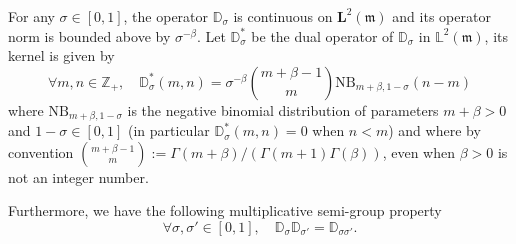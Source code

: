 \documentclass[AHL,Unicode,longabstracts]{cedram}
\newcommand{\df}{\mathrel{:=}}
\newcommand{\LL}{\mathbb{L}}
\newcommand{\ZZ}{\mathbb{Z}}
\newcommand{\fm}{\mathfrak{m}}
\newcommand{\esL}{\mathbf{L}}
\newcommand{\discret}[1]{\mathds{#1}}
\let\oldforall\forall
\renewcommand*{\forall}{\mathrel{\oldforall}}
\begin{document}
\begin{lemm}\label{dualdD}
For any $\sigma\in [0,1]$, the operator $\discret{D}_{\sigma}$ is continuous on $\esL^2(\fm)$ and its operator norm is bounded above by ${\sigma}^{-\beta}$. Let $\discret{D}_{\sigma}^*$ be the dual operator of $\discret{D}_{\sigma}$ in $\LL^2(\fm)$, its kernel is given by
\[
\forall m,n\in\ZZ_+,\quad
\discret{D}_{\sigma}^*(m,n)={\sigma}^{-\beta}\binom{m+\beta-1}{m}\mathrm{NB}_{m+\beta,1-{\sigma}}(n-m)
\]
where $\mathrm{NB}_{m+\beta,1-{\sigma}}$ is the negative binomial distribution of parameters $m+\beta>0$ and $1-{\sigma}\in[0,1]$ (in particular $\discret{D}_{\sigma}^*(m,n)=0$ when $n<m$) and where by convention $\binom{m+\beta-1}{m}\df \Gamma(m+\beta)/(\Gamma(m+1)\Gamma(\beta))$, even when $\beta>0$ is not an integer number.

Furthermore, we have the following multiplicative semi-group property
\[
\forall \sigma,{\sigma}'\in[0,1],\quad \discret{D}_{\sigma}\discret{D}_{{\sigma}'}=\discret{D}_{{\sigma}{\sigma}'}.
\]
\end{lemm}
\end{document}
